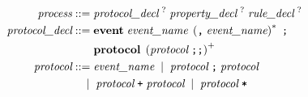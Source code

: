 \documentclass[preview=true]{standalone}
\begin{document}
\begin{table}[t]
\newcommand{\token}[1]{\textbf{#1}}
\begin{align*}
  \textit{process} &::=
  \textit{protocol\_decl}\;^?\;
   \textit{property\_decl}\;^?\;
   \textit{rule\_decl}\;^?\;
  \\
  \medskip
  \textit{protocol\_decl} &::=
    \token{event}\;
      \textit{event\_name}\;
      \left(\texttt{,}\; \textit{event\_name}\right)^\ast\; \texttt{;}
  \\&\hspace{1.9em}
  \token{protocol}\;
   \left(\textit{protocol}\; \texttt{;;}\right)^+
  \\
  \textit{protocol} &::=
  \textit{event\_name}\;
  \mid\; \textit{protocol}\; \texttt{;}\; \textit{protocol}\;
  \\&\quad
  \mid\;
  \textit{protocol}\; \texttt{+}\; \textit{protocol}\;
  \mid\;
  \textit{protocol}\; \texttt{*}\;
  \\

\end{align*}
\end{table}
\end{document}
